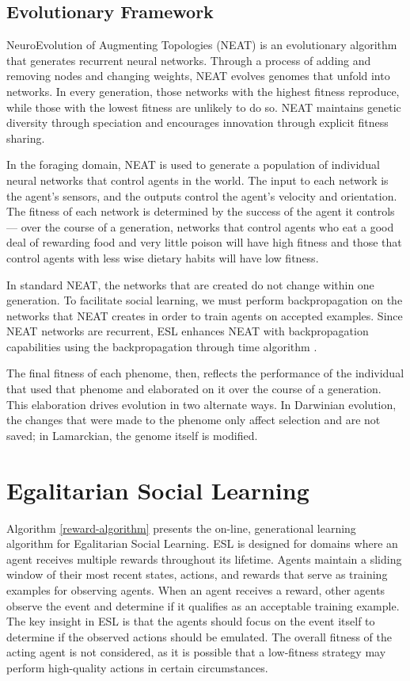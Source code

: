 \documentclass{sig-alternate}
\begin{document}
\subsection*{Evolutionary Framework}
NeuroEvolution of Augmenting Topologies (NEAT)\cite{stanley2002evolving} is an evolutionary algorithm that generates recurrent neural networks. Through a process of adding and removing nodes and changing weights, NEAT evolves genomes that unfold into networks. In every generation, those networks with the highest fitness reproduce, while those with the lowest fitness are unlikely to do so. NEAT maintains genetic diversity through speciation and encourages innovation through explicit fitness sharing.

In the foraging domain, NEAT is used to generate a population of individual neural networks that control agents in the world. The input to each network is the agent's sensors, and the outputs control the agent's velocity and orientation. The fitness of each network is determined by the success of the agent it controls--- over the course of a generation, networks that control agents who eat a good deal of rewarding food and very little poison will have high fitness and those that control agents with less wise dietary habits will have low fitness.

In standard NEAT, the networks that are created do not change within one generation. To facilitate social learning, we must perform backpropagation \cite{rumelhart1986learning} on the networks that NEAT creates in order to train agents on accepted examples. Since NEAT networks are recurrent, ESL enhances NEAT with backpropagation capabilities using the backpropagation through time algorithm \cite{werbos1990backpropagation} .

The final fitness of each phenome, then, reflects the performance of the individual that used that phenome and elaborated on it over the course of a generation. This elaboration drives evolution in two alternate ways.  In Darwinian evolution, the changes that were made to the phenome only affect selection and are not saved; in Lamarckian, the genome itself is modified.

\section{Egalitarian Social Learning}
\label{sec:rbsl}

Algorithm \ref{reward-algorithm} presents the on-line, generational learning algorithm for Egalitarian Social Learning. ESL is designed for domains where an agent receives multiple rewards throughout its lifetime. Agents maintain a sliding window of their most recent states, actions, and rewards that serve as training examples for observing agents. When an agent receives a reward, other agents observe the event and determine if it qualifies as an acceptable training example. The key insight in ESL is that the agents should focus on the event itself to determine if the observed actions should be emulated. The overall fitness of the acting agent is not considered, as it is possible that a low-fitness strategy may perform high-quality actions in certain circumstances.
\end{document}
